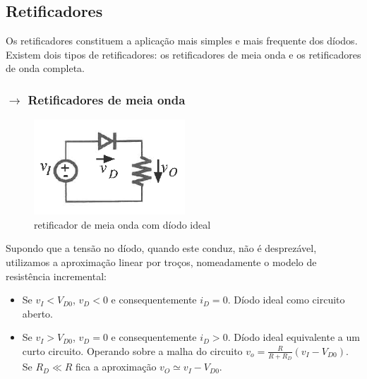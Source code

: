 \clearpage
\subsection[2.2 Retificadores]{\hspace*{0.075 em}\raisebox{0.2 em}{$\pmb{\drsh}$} Retificadores}
\label{subsec:rectifiers}

\noindent Os retificadores constituem a aplicação mais simples e mais frequente dos díodos. Existem dois tipos de retificadores: os retificadores de meia onda e os retificadores de onda completa.

\subsubsection[2.2.1 Retificadores de meia onda]{$\pmb{\rightarrow}$ Retificadores de meia onda}

\vspace{-1 em}
\begin{figure}[H]
    \centering
    \includegraphics[width = 0.4\linewidth]{img/2/ret-meia-onda.png}
    \caption{retificador de meia onda com díodo ideal}
    \label{fig:ret-meia-onda}
\end{figure}

\noindent Supondo que a tensão no díodo, quando este conduz, não é desprezável,
utilizamos a aproximação linear por troços, nomeadamente o modelo de resistência incremental:

\begin{itemize}[leftmargin=*]
    \item Se $v_I < V_{D0}$, $v_D < 0$ e consequentemente $i_D = 0$. Díodo ideal como circuito aberto.
    \item Se $v_I > V_{D0}$, $v_D = 0$ e consequentemente $i_D > 0$. Díodo ideal equivalente a um curto circuito. Operando sobre a malha do circuito $v_o = \frac{R}{R + R_D}(v_I - V_{D0})$. Se $R_D \ll R$ fica a aproximação $v_O \simeq v_I - V_{D0}$.
\end{itemize}

